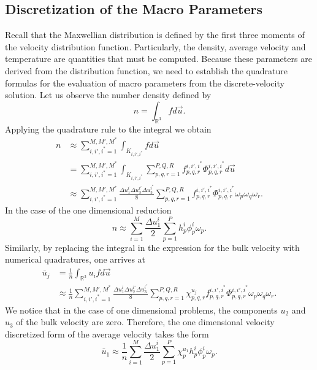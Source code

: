 \subsection{Discretization of the Macro Parameters}
Recall that the Maxwellian distribution is defined by the first three moments of the velocity distribution function. Particularly, the density, average velocity and temperature are quantities that must be computed. Because these parameters are derived from the distribution function, we need to establish the quadrature formulas for the evaluation of macro parameters from the discrete-velocity solution. Let us observe the number density defined by
%
\begin{equation*}
n = \int_{\mathbb{R}^3} f d\vec{u}.
\end{equation*}
%
Applying the quadrature rule to the integral we obtain
%
\begin{align*}
n &\approx \sum_{i,i',i^*=1}^{M,M',M^*} \int_{K_{i,i',i^*}} f d\vec{u}\\
&= \sum_{i,i',i^*=1}^{M,M',M^*} \int_{K_{i,i',i^*}} \sum_{p,q,r=1}^{P,Q,R} f_{p,q,r}^{i,i',i^*} \Phi_{p,q,r}^{i,i',i^*} d\vec{u}\\
&\approx \sum_{i,i',i^*=1}^{M,M',M^*} \frac{\Delta u_1^{i} \Delta u_3^{i'} \Delta u_3^{i^*}}{8} \sum_{p,q,r=1}^{P,Q,R} f_{p,q,r}^{i,i',i^*} \Phi_{p,q,r}^{i,i',i^*} \omega_p \omega_q \omega_r.
\end{align*}
%
In the case of the one dimensional reduction
%
\begin{equation*}
n \approx \sum_{i=1}^M \frac{\Delta u_1^i}{2} \sum_{p=1}^P h_p^i \phi_p^i \omega_p.
\end{equation*}
%
Similarly, by replacing the integral in the expression for the bulk velocity with numerical quadratures, one arrives at
%
\begin{align*}
\bar{u}_j &= \frac{1}{n} \int_{\mathbb{R}^3} u_i f d\vec{u}\\
&\approx \frac{1}{n} \sum_{i,i',i^*=1}^{M,M',M^*} \frac{\Delta u_1^{i} \Delta u_2^{i'} \Delta u_3^{i^*}}{8} \sum_{p,q,r=1}^{P,Q,R} \chi_{p,q,r}^{u_j} f_{p,q,r}^{i,i',i^*} \Phi_{p,q,r}^{i,i',i^*} \omega_p \omega_q \omega_r.
\end{align*}
%
We notice that in the case of one dimensional problems, the components $u_2$ and $u_3$ of the bulk velocity are zero. Therefore, the one dimensional velocity discretized form of the average velocity takes the form
%
\begin{equation*}
\bar{u}_1 \approx \frac{1}{n} \sum_{i=1}^{M} \frac{\Delta u_1^{i}}{2} \sum_{p=1}^{P} \chi_p^{u_1} h_{p}^{i} \phi_{p}^{i} \omega_p.
\end{equation*}
